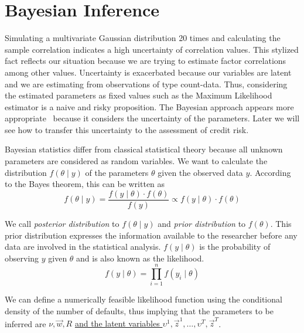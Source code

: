 \documentclass[11pt,fleqn]{book} %
\begin{document}
\section{Bayesian Inference}

Simulating a multivariate Gaussian distribution 20 times and calculating 
the sample correlation indicates a high uncertainty of correlation values. 
This stylized fact reflects our situation because we are trying to estimate 
factor correlations among other values. Uncertainty is exacerbated because 
our variables are latent and we are estimating from observations of type 
count-data. Thus, considering the estimated parameters as fixed values such 
as the Maximum Likelihood estimator is a naive and risky proposition. 
The Bayesian approach appears more appropriate~\cite{gossl:2005,tarashev:2010}
because it considers the uncertainty of the parameters. Later we will see 
how to transfer this uncertainty to the assessment of credit risk.

Bayesian statistics differ from classical statistical theory because all 
unknown parameters are considered as random variables. We want to calculate 
the distribution $f(\theta \mid y)$ of the parameters $\theta$ given the 
observed data $y$. According to the Bayes theorem, this can be written as
\begin{displaymath}
	f(\theta \mid y) = \frac{f(y \mid \theta) \cdot f(\theta)}{f(y)} \propto f(y \mid \theta) \cdot f(\theta)
\end{displaymath}

We call \emph{posterior distribution} to $f(\theta \mid y)$ and 
\emph{prior distribution} to $f(\theta)$. This prior distribution 
expresses the information available to the researcher before 
any data are involved in the statistical analysis. $f(y \mid \theta)$ 
is the probability of observing $y$ given $\theta$ and is also 
known as the likelihood.
\begin{displaymath}
	f(y \mid \theta) = \prod_{i=1}^n f(y_i \mid \theta)
\end{displaymath}

We can define a numerically feasible likelihood function using the 
conditional density of the number of defaults, thus implying that the 
parameters to be inferred are $\nu,\vec{w},R$ \ul{and the latent variables 
$\upsilon^1,\vec{z}^1,\dots,\upsilon^T,\vec{z}^T$}.
\end{document}

